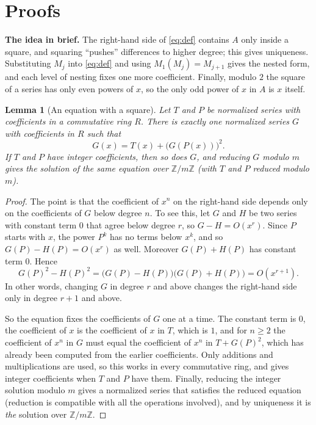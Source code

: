 \documentclass[11pt,a4paper]{article}
\newtheorem{lemma}[theorem]{Lemma}
\theoremstyle{definition}
\theoremstyle{remark}
\newcommand{\Z}{\mathbb{Z}}
\newcommand{\para}[1]{\par\medskip\noindent\textbf{#1}\enspace}
\begin{document}
\section{Proofs}\label{sec:proofs}

\para{The idea in brief.} The right-hand side of \eqref{eq:def} contains $A$ only inside a square, and squaring
``pushes'' differences to higher degree; this gives uniqueness. Substituting $M_j$ into \eqref{eq:def} and using
$M_1(M_j)=M_{j+1}$ gives the nested form, and each level of nesting fixes one more coefficient. Finally, modulo $2$ the
square of a series has only even powers of $x$, so the only odd power of $x$ in $A$ is $x$ itself.

\begin{lemma}[An equation with a square]\label{lem:square}
Let $T$ and $P$ be normalized series with coefficients in a commutative ring $R$. There is exactly one normalized
series $G$ with coefficients in $R$ such that
\[
G(x)=T(x)+\bigl(G(P(x))\bigr)^2 .
\]
If $T$ and $P$ have integer coefficients, then so does $G$, and reducing $G$ modulo $m$ gives the solution of the same
equation over $\Z/m\Z$ (with $T$ and $P$ reduced modulo $m$).
\end{lemma}

\begin{proof}
The point is that the coefficient of $x^n$ on the right-hand side depends only on the coefficients of $G$ below degree
$n$. To see this, let $G$ and $H$ be two series with constant term $0$ that agree below degree $r$, so $G-H=O(x^r)$.
Since $P$ starts with $x$, the power $P^k$ has no terms below $x^k$, and so $G(P)-H(P)=O(x^r)$ as well. Moreover
$G(P)+H(P)$ has constant term $0$. Hence
\[
G(P)^2-H(P)^2=\bigl(G(P)-H(P)\bigr)\bigl(G(P)+H(P)\bigr)=O(x^{r+1}).
\]
In other words, changing $G$ in degree $r$ and above changes the right-hand side only in degree $r+1$ and above.

So the equation fixes the coefficients of $G$ one at a time. The constant term is $0$, the coefficient of $x$ is the
coefficient of $x$ in $T$, which is $1$, and for $n\ge2$ the coefficient of $x^n$ in $G$ must equal the coefficient of
$x^n$ in $T+G(P)^2$, which has already been computed from the earlier coefficients. Only additions and multiplications
are used, so this works in every commutative ring, and gives integer coefficients when $T$ and $P$ have them. Finally,
reducing the integer solution modulo $m$ gives a normalized series that satisfies the reduced equation (reduction is
compatible with all the operations involved), and by uniqueness it is \emph{the} solution over $\Z/m\Z$.
\end{proof}
\end{document}
